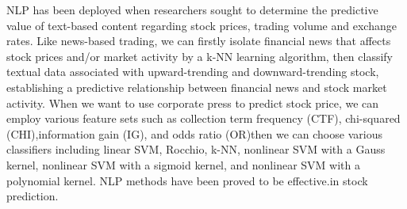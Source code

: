 \documentclass{article}
\begin{document}
NLP has been deployed when researchers sought to determine the predictive value of text-based content regarding stock prices, trading volume and exchange rates. Like news-based trading, we can firstly isolate financial news that affects stock prices and/or market activity by a k-NN learning algorithm, then classify textual data associated with upward-trending and downward-trending stock, establishing a predictive relationship between financial news and stock market activity. When we want to use corporate press to predict stock price, we can employ various feature sets such as collection term frequency (CTF), chi-squared (CHI),information gain (IG), and odds ratio (OR)then we can choose various classifiers including linear SVM, Rocchio, k-NN, nonlinear SVM with a Gauss kernel, nonlinear SVM with a sigmoid kernel, and nonlinear SVM with a polynomial kernel. NLP methods have been proved to be effective.in stock prediction.
\end{document}
